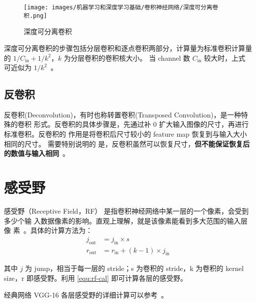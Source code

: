 \begin{figure}[ht]
  \centering
  \texttt{[image: images/机器学习和深度学习基础/卷积神经网络/深度可分离卷积.png]}
  \caption{深度可分离卷积}
  \label{fig:ds-conv}
\end{figure}

深度可分离卷积的步骤包括分层卷积和逐点卷积两部分，计算量为标准卷积计算量的 $ 1 /
C_{\mathrm{in}} + 1/k^2 $，$k$ 为分层卷积的卷积核大小。
当 channel 数 $C_{\mathrm{in}}$ 较大时，上式可近似为 $1 / k^2$~。

\subsection{反卷积}

反卷积(Deconvolution)，有时也称转置卷积(Transposed Convolution)，是一种特殊的卷积
形式。反卷积的具体步骤是，先通过补 0 扩大输入图像的尺寸，再进行标准卷积。反卷积的
作用是将卷积后尺寸较小的 feature map 恢复到与输入大小相同的尺寸。 需要特别说明的
是，反卷积虽然可以恢复尺寸，\textbf{但不能保证恢复后的数值与输入相同}~。

\section{感受野}

感受野（Receptive Field，RF） 是指卷积神经网络中某一层的一个像素，会受到多少个输
入数据像素的影响。直观上理解，就是该像素能看到多大范围的输入层像
素~。具体的计算方法为：
\begin{align}
\label{equ:rf-cal}
j_{\mathrm {out}} & = j_{\mathrm{in}} \times s \\
r_{\mathrm {out}} & = r_{\mathrm{in}} + (k-1) \times j_{\mathrm{in}}
\end{align}

其中 $j$ 为 jump，相当于每一层的 stride；s 为卷积的 stride，k 为卷积的 kernel
size，r 即感受野。利用 \eqref{equ:rf-cal} 即可计算各层的感受野。

经典网络 VGG-16 各层感受野的详细计算可以参考~。

